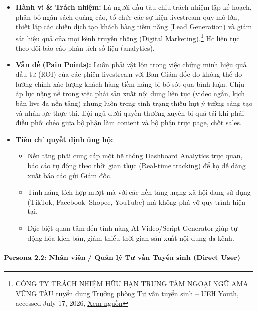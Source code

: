 \begin{itemize}
    \item \textbf{Hành vi \& Trách nhiệm:} Là người đầu tàu chịu trách nhiệm lập kế hoạch, phân bổ ngân sách quảng cáo, tổ chức các sự kiện livestream quy mô lớn, thiết lập các chiến dịch tạo khách hàng tiềm năng (Lead Generation) và giám sát hiệu quả của mọi kênh truyền thông (Digital Marketing).\footnote{CÔNG TY TRÁCH NHIỆM HỮU HẠN TRUNG TÂM NGOẠI NGỮ AMA VŨNG TÀU tuyển dụng Trưởng phòng Tư vấn tuyển sinh -- UEH Youth, accessed July 17, 2026, \href{https://youth.ueh.edu.vn/ho-tro-sinh-vien-2/cong-ty-trach-nhiem-huu-han-trung-tam-ngoai-ngu-ama-vung-tau-tuyen-dung-truong-phong-tu-van-tuyen-sinh/}{Xem nguồn}} Họ liên tục theo dõi báo cáo phân tích số liệu (analytics).

    \item \textbf{Vấn đề (Pain Points):} Luôn phải vật lộn trong việc chứng minh hiệu quả đầu tư (ROI) của các phiên livestream với Ban Giám đốc do không thể đo lường chính xác lượng khách hàng tiềm năng bị bỏ sót qua bình luận. Chịu áp lực nặng nề trong việc phải sản xuất nội dung liên tục (video ngắn, kịch bản live đa nền tảng) nhưng luôn trong tình trạng thiếu hụt ý tưởng sáng tạo và nhân lực thực thi. Đội ngũ dưới quyền thường xuyên bị quá tải khi phải điều phối chéo giữa bộ phận làm content và bộ phận trực page, chốt sales.

    \item \textbf{Tiêu chí quyết định ủng hộ:}
    \begin{itemize}
        \item Nền tảng phải cung cấp một hệ thống Dashboard Analytics trực quan, báo cáo tự động theo thời gian thực (Real-time tracking) để họ dễ dàng xuất báo cáo gửi Giám đốc.

        \item Tính năng tích hợp mượt mà với các nền tảng mạng xã hội đang sử dụng (TikTok, Facebook, Shopee, YouTube) mà không phá vỡ quy trình hiện tại.

        \item Đặc biệt quan tâm đến tính năng AI Video/Script Generator giúp tự động hóa kịch bản, giảm thiểu thời gian sản xuất nội dung đa kênh.
    \end{itemize}
\end{itemize}

\paragraph{Persona 2.2: Nhân viên / Quản lý Tư vấn Tuyển sinh (Direct User)}

